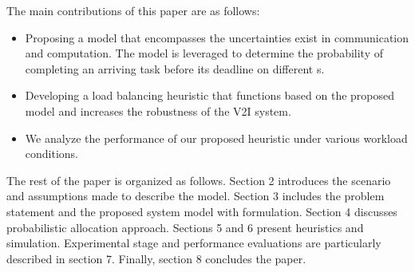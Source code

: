 The main contributions of this paper are as follows:

\begin{itemize}
	\item Proposing a model that encompasses the uncertainties exist in communication and computation. The model is leveraged to determine the probability of completing an arriving task before its deadline on different \bs s.
	\item Developing a load balancing heuristic that functions based on the proposed model and increases the robustness of the V2I system.
	\item We analyze the performance of our proposed heuristic under various workload conditions.
\end{itemize}

The rest of the paper is organized as follows. Section 2 introduces the scenario and assumptions made to describe the model. Section 3 includes the problem statement and the proposed system model with formulation. Section 4 discusses probabilistic allocation approach. Sections 5 and 6 present heuristics and simulation. Experimental stage and performance evaluations are particularly described in section 7. Finally, section 8 concludes the paper.


